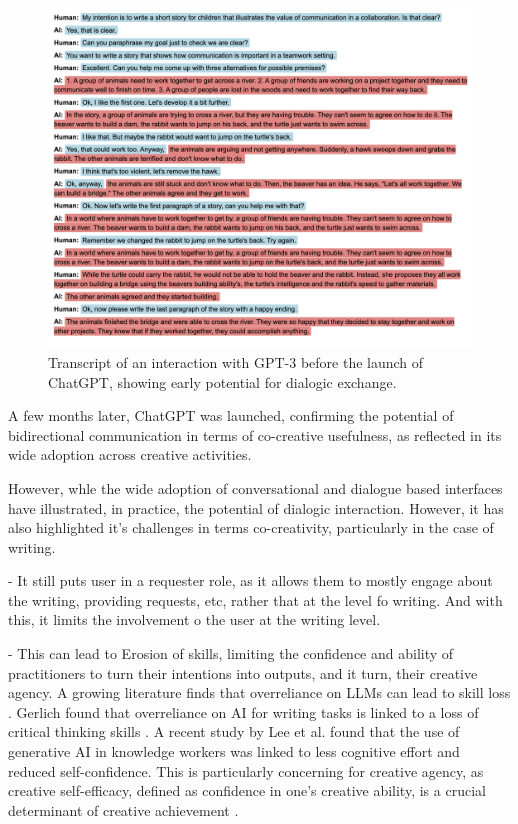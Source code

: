 \begin{figure}[H]
    \centering
    \includegraphics[width=1\linewidth]{transcriptgenchi.png}
    \caption{Transcript of an interaction with GPT-3 before the launch of ChatGPT, showing early potential for dialogic exchange.}
    \label{fig:genchi_transcript}
\end{figure}

A few months later, ChatGPT was launched, confirming the potential of bidirectional communication in terms of co-creative usefulness, as reflected in its wide adoption across creative activities. 

However, whle the wide adoption of conversational and dialogue based interfaces have illustrated, in practice, the potential of dialogic interaction. However, it has also highlighted it's challenges in terms co-creativity, particularly in the case of writing. 

- It still puts user in a requester role, as it allows them to mostly engage about the writing, providing requests, etc, rather that at the level fo writing. And with this, it limits the involvement o the user at the writing level. 

- This can lead to Erosion of skills, limiting the confidence and ability of practitioners to turn their intentions into outputs, and it turn, their creative agency. A growing literature finds that overreliance on LLMs can lead to skill loss \cite{Heersmink2024-mk, Rafner2021-tm}. Gerlich found that overreliance on AI for writing tasks is linked to a loss of critical thinking skills \cite{Gerlich2025-as}. A recent study by Lee et al. \cite{Lee2025-dw} found that the use of generative AI in knowledge workers was linked to less cognitive effort and reduced self-confidence. This is particularly concerning for creative agency, as creative self-efficacy, defined as confidence in one's creative ability, is a crucial determinant of creative achievement \cite{Tierney2002-xp}. 

